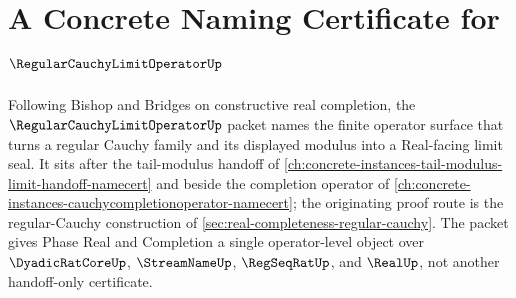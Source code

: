 \chapter{A Concrete Naming Certificate for $\RegularCauchyLimitOperatorUp$}
\label{ch:concrete-instances-regular-cauchy-limit-operator-namecert}

Following Bishop and Bridges on constructive real completion, the $\RegularCauchyLimitOperatorUp$ packet names the finite operator surface that turns a regular Cauchy family and its displayed modulus into a Real-facing limit seal. It sits after the tail-modulus handoff of \autoref{ch:concrete-instances-tail-modulus-limit-handoff-namecert} and beside the completion operator of \autoref{ch:concrete-instances-cauchycompletionoperator-namecert}; the originating proof route is the regular-Cauchy construction of \autoref{sec:real-completeness-regular-cauchy}. The packet gives Phase Real and Completion a single operator-level object over $\DyadicRatCoreUp$, $\StreamNameUp$, $\RegSeqRatUp$, and $\RealUp$, not another handoff-only certificate.

